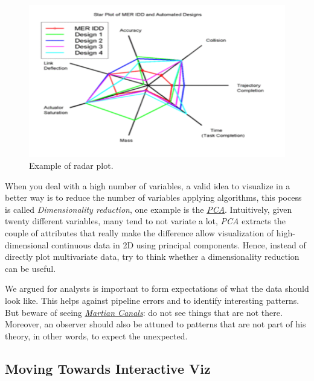 \begin{itemize}
\begin{itemize}
\begin{figure}[h]%
 \centering
 \includegraphics[width=13cm]{./img/06/radar}
 \caption{\label{pic:radar} Example of radar plot.}
\end{figure}
\end{itemize}
\end{itemize}


When you deal with a high number of variables, a valid idea to visualize in a better way is to reduce the number of variables applying algorithms, this pocess is called \emph{Dimensionality reduction}, one example is the \href{https://en.wikipedia.org/wiki/Principal\_component\_analysis}{ \emph{PCA}}. Intuitively, given twenty different variables, many tend to not variate a lot, \emph{PCA} extracts the couple of attributes that really make the difference allow visualization of high-dimensional continuous data in 2D using principal components. Hence, instead of directly plot multivariate data, try to think whether a dimensionality reduction can be useful.

We argued for analysts is important to form expectations of what the data should look like. This helps against pipeline errors and to identify interesting patterns. 
\\
But beware of seeing \href{https://en.wikipedia.org/wiki/Martian_canal}{\emph{Martian Canals}}: do not see things that are not there. Moreover, an observer should also be attuned to patterns that are not part of his theory, in other words, to expect the unexpected. 


\subsection{Moving Towards Interactive Viz}

